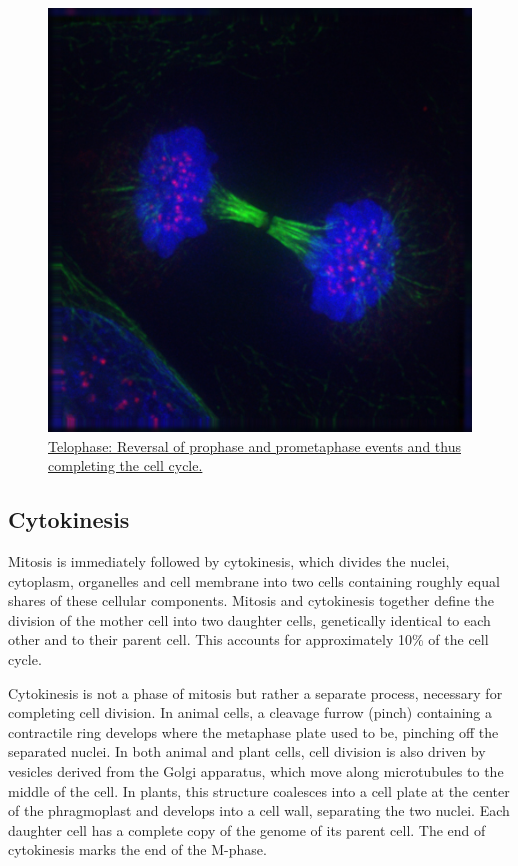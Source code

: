 \begin{figure}

{\centering \includegraphics[width=0.7\linewidth]{./figures/reproduction/TelophaseIF} 

}

\caption{\href{https://commons.wikimedia.org/wiki/File:TelophaseIF.jpg}{Telophase: Reversal of prophase and prometaphase events and thus completing the cell cycle.}}\label{fig:telophase}
\end{figure}

\hypertarget{cytokinesis}{%
\subsection{Cytokinesis}\label{cytokinesis}}

Mitosis is immediately followed by cytokinesis, which divides the nuclei, cytoplasm, organelles and cell membrane into two cells containing roughly equal shares of these cellular components. Mitosis and cytokinesis together define the division of the mother cell into two daughter cells, genetically identical to each other and to their parent cell. This accounts for approximately 10\% of the cell cycle.

Cytokinesis is not a phase of mitosis but rather a separate process, necessary for completing cell division. In animal cells, a cleavage furrow (pinch) containing a contractile ring develops where the metaphase plate used to be, pinching off the separated nuclei. In both animal and plant cells, cell division is also driven by vesicles derived from the Golgi apparatus, which move along microtubules to the middle of the cell. In plants, this structure coalesces into a cell plate at the center of the phragmoplast and develops into a cell wall, separating the two nuclei. Each daughter cell has a complete copy of the genome of its parent cell. The end of cytokinesis marks the end of the M-phase.

